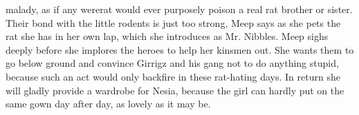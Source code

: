 malady, as if any wererat would ever purposely poison a real rat brother or sister. Their bond with the little rodents is just too strong, Meep says as she pets the rat she has in her own lap, which she introduces as Mr. Nibbles. Meep sighs deeply before she implores the heroes to help her kinsmen out. She wants them to go below ground and convince Girrigz and his gang not to do anything stupid, because such an act would only backfire in these rat-hating days. In return she will gladly provide a wardrobe for Nesia, because the girl can hardly put on the same gown day after day, as lovely as it may be.\\


